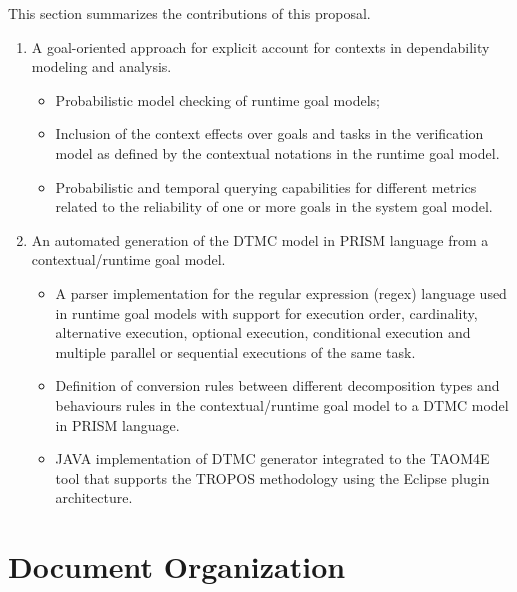 This section summarizes the contributions of this proposal.


\begin{enumerate}

\item A goal-oriented approach for explicit account for contexts in dependability modeling and analysis. 

\begin{itemize}

\item Probabilistic model checking of runtime goal models;
\medskip

\item Inclusion of the context effects over goals and tasks in the verification model as defined by the contextual notations in the runtime goal model.
\medskip

\item Probabilistic and temporal querying capabilities for different metrics related to the reliability of one or more goals in the system goal model.
\end{itemize}
\bigskip

\item An automated generation of the DTMC model in PRISM language from a contextual/runtime goal model.
\begin{itemize}

\item A parser implementation for the regular expression (regex) language used in runtime goal models with support for execution order, cardinality, alternative execution, optional execution, conditional execution and multiple parallel or sequential executions of the same task. 
\medskip

\item Definition of conversion rules between different decomposition types and behaviours rules in the contextual/runtime goal model to a DTMC model in PRISM language.
\medskip

\item JAVA implementation of DTMC generator integrated to the TAOM4E tool that supports the TROPOS methodology using the Eclipse plugin architecture.
\end{itemize}

\end{enumerate}

\section{Document Organization}

